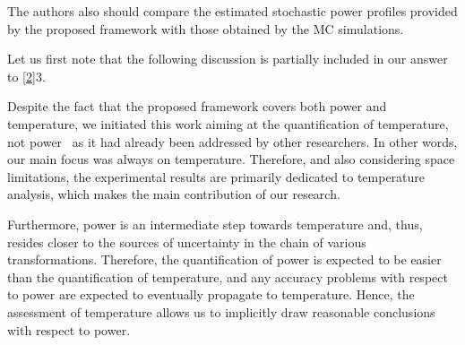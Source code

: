 \begin{authors}
\begin{actions}
\end{actions}
\end{authors}

\begin{reviewer}
The authors also should compare the estimated stochastic power profiles provided by the proposed framework with those obtained by the MC simulations.
\end{reviewer}
\begin{authors}
Let us first note that the following discussion is partially included in our answer to \cref{2}{3}.

Despite the fact that the proposed framework covers both power and temperature, we initiated this work aiming at the quantification of temperature, not power \perse\ as it had already been addressed by other researchers.
In other words, our main focus was always on temperature.
Therefore, and also considering space limitations, the experimental results are primarily dedicated to temperature analysis, which makes the main contribution of our research.

Furthermore, power is an intermediate step towards temperature and, thus, resides closer to the sources of uncertainty in the chain of various transformations.
Therefore, the quantification of power is expected to be easier than the quantification of temperature, and any accuracy problems with respect to power are expected to eventually propagate to temperature.
Hence, the assessment of temperature allows us to implicitly draw reasonable conclusions with respect to power.

\begin{actions}
\end{actions}
\end{authors}

